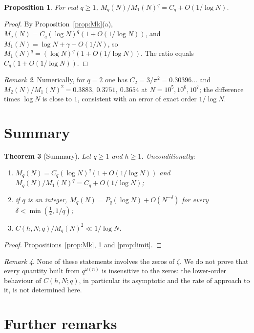 \documentclass[11pt]{amsart}
\newtheorem{theorem}{Theorem}[section]
\newtheorem{proposition}[theorem]{Proposition}
\theoremstyle{definition}
\theoremstyle{remark}
\newtheorem{remark}[theorem]{Remark}
\newcommand{\half}{\tfrac12}
\newcommand{\om}{\omega}
\begin{document}
\begin{proposition}\label{prop:ratio}
  For real $q\ge1$, $M_q(N)/M_1(N)^{q} = C_q + O(1/\log N)$.
\end{proposition}
\begin{proof}
  By Proposition~\ref{prop:Mk}(a), $M_q(N) = C_q(\log N)^q(1+O(1/\log N))$, and
  $M_1(N) = \log N + \gamma + O(1/N)$, so $M_1(N)^{q} = (\log N)^q(1+O(1/\log N))$.
  The ratio equals $C_q(1+O(1/\log N))$.
\end{proof}

\begin{remark}
  Numerically, for $q=2$ one has $C_2=3/\pi^2=0.30396\ldots$ and
  $M_2(N)/M_1(N)^2=0.3883,\ 0.3751,\ 0.3654$ at $N=10^5,10^6,10^7$; the difference times
  $\log N$ is close to $1$, consistent with an error of exact order $1/\log N$.
\end{remark}

\section{Summary}
\label{sec:architecture}

\begin{theorem}[Summary]\label{thm:barrier}
  Let $q\ge1$ and $h\ge1$.  Unconditionally:
  \begin{enumerate}
  \item[(i)] $M_q(N)=C_q(\log N)^q(1+O(1/\log N))$ and $M_q(N)/M_1(N)^q=C_q+O(1/\log N)$;
  \item[(ii)] if $q$ is an integer, $M_q(N)=P_q(\log N)+O(N^{-\delta})$ for every
    $\delta<\min(\half,1/q)$;
  \item[(iii)] $C(h,N;q)/M_q(N)^2\ll1/\log N$.
  \end{enumerate}
\end{theorem}
\begin{proof}
  Propositions~\ref{prop:Mk}, \ref{prop:ratio} and \ref{prop:limit}.
\end{proof}

\begin{remark}
  None of these statements involves the zeros of $\zeta$.  We do not prove that every
  quantity built from $q^{\om(n)}$ is insensitive to the zeros: the lower-order behaviour
  of $C(h,N;q)$, in particular its asymptotic and the rate of approach to it, is not
  determined here.
\end{remark}

\section{Further remarks}
\label{sec:consequences}
\end{document}
